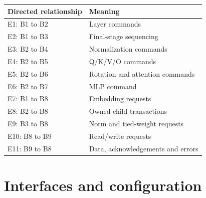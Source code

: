 \documentclass[11pt,a4paper]{article}
\begin{document}
{\small\renewcommand{\arraystretch}{1.18}\begin{longtable}{@{}L{0.24\textwidth}|L{0.7\textwidth}@{}}\toprule

\textbf{Directed relationship} & \textbf{Meaning}\\\midrule\endhead

E1: B1 to B2 & Layer commands\\[2pt]\hline

E2: B1 to B3 & Final-stage sequencing\\[2pt]\hline

E3: B2 to B4 & Normalization commands\\[2pt]\hline

E4: B2 to B5 & Q/\allowbreak{}K/\allowbreak{}V/\allowbreak{}O commands\\[2pt]\hline

E5: B2 to B6 & Rotation and attention commands\\[2pt]\hline

E6: B2 to B7 & MLP command\\[2pt]\hline

E7: B1 to B8 & Embedding requests\\[2pt]\hline

E8: B2 to B8 & Owned child transactions\\[2pt]\hline

E9: B3 to B8 & Norm and tied-weight requests\\[2pt]\hline

E10: B8 to B9 & Read/\allowbreak{}write requests\\[2pt]\hline

E11: B9 to B8 & Data,\allowbreak{} acknowle\allowbreak{}dgements and errors\\[2pt]\hline

\bottomrule\end{longtable}}

\section{Interfaces and configuration}
\end{document}
